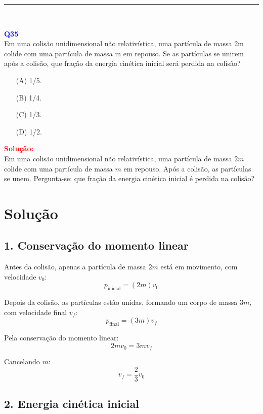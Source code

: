 \documentclass[a4paper,12pt]{article}
\begin{document}
\noindent\rule{\linewidth}{0.6pt}\\

\begin{flushleft}
\textbf{\textcolor{blue}{\Large Q35}}\\
\noindent
Em uma colisão unidimensional não relativística, uma
partícula de massa 2m colide com uma partícula de massa m
em repouso. Se as partículas se unirem após a colisão, que
fração da energia cinética inicial será perdida na colisão?

\begin{itemize}
\item[(A)] 1/5.
\item[(B)] 1/4.
\item[(C)] 1/3.
\item[(D)] 1/2.
\end{itemize}

\vspace{0.5cm}

\textcolor{red}{\textbf{Solução:}}\\

Em uma colisão unidimensional não relativística, uma partícula de massa \(2m\) colide com uma partícula de massa \(m\) em repouso.  
Após a colisão, as partículas se unem. Pergunta-se: que fração da energia cinética inicial é perdida na colisão?

\section*{Solução}

\subsection*{1. Conservação do momento linear}

Antes da colisão, apenas a partícula de massa \(2m\) está em movimento, com velocidade \(v_0\):
\[
p_\text{inicial} = (2m) v_0
\]

Depois da colisão, as partículas estão unidas, formando um corpo de massa \(3m\), com velocidade final \(v_f\):
\[
p_\text{final} = (3m) v_f
\]

Pela conservação do momento linear:
\[
\boxed{
2m v_0 = 3m v_f}
\]

Cancelando \(m\):
\[
v_f = \frac{2}{3} v_0
\]

\subsection*{2. Energia cinética inicial}


\end{flushleft}
\end{document}
